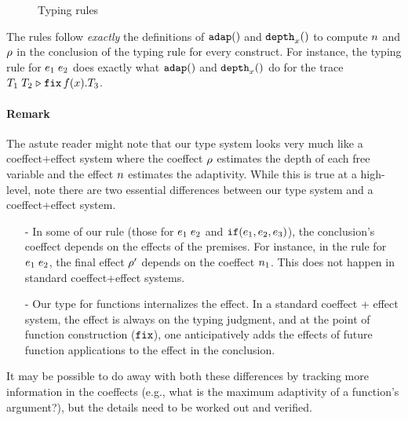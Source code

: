 \documentclass[a4paper,11pt]{article}
\theoremstyle{definition}
\begin{document}
\begin{figure}

  \caption{Typing rules}
  \label{fig:type-rules}
\end{figure}

The rules follow \emph{exactly} the definitions of $\mathtt{adap}()$ and
$\mathtt{depth}_{x}()$ to compute $n$ and $\rho$ in the conclusion of the
typing rule for every construct. For instance, the typing rule for
$e_1 \; e_2$ does exactly what $\mathtt{adap}()$ and $\mathtt{depth}_{x}()$
do for the trace $T_1 \; T_2 \mathrel{\triangleright} {\mathop{\mathtt{fix}} f(x).T_3}$.

\paragraph{Remark}
The astute reader might note that our type system looks very much like
a coeffect+effect system where the coeffect $\rho$ estimates the
depth of each free variable and the effect $n$ estimates the
adaptivity. While this is true at a high-level, note there are two
essential differences between our type system and a coeffect+effect
system.
\begin{itemize}
\item[-] In some of our rule (those for $e_1 \; e_2$ and
  $\mathtt{if}(e_1, e_2, e_3)$), the conclusion's coeffect
  depends on the effects of the premises. For instance, in the rule
  for $e_1 \; e_2$, the final effect $\rho'$ depends on
  the coeffect $n_1$. This does not happen in standard
  coeffect+effect systems.
\item[-] Our type for functions internalizes the effect. In a standard
  coeffect + effect system, the effect is always on the typing
  judgment, and at the point of function construction ($\mathop{\mathtt{fix}}$), one
  anticipatively adds the effects of future function applications to
  the effect in the conclusion.
\end{itemize}
It may be possible to do away with both these differences by tracking
more information in the coeffects (e.g., what is the maximum
adaptivity of a function's argument?), but the details need to be
worked out and verified.
\end{document}
